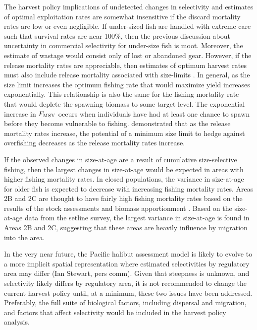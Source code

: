 The harvest policy implications of undetected changes in selectivity and estimates of optimal exploitation rates are somewhat insensitive if the discard mortality rates are low or even negligible.  If under-sized fish are handled with extreme care such that survival rates are near 100\%, then the previous discussion about uncertainty in commercial selectivity for under-size fish is moot.  Moreover, the estimate of wastage would consist only of lost or abandoned gear.  However, if the release mortality rates are appreciable, then estimates of optimum harvest rates must also include release mortality associated with size-limits  \citep{goodyear1993spawning,coggins2007ecm}.  In general,  as the size limit increases the optimum fishing rate that would maximize yield increases exponentially.  This relationship is also the same for the fishing mortality rate that would deplete the spawning biomass to some target level.  The exponential increase in $F_{\rm{MSY}}$ occurs when individuals have had at least one chance to spawn before they become vulnerable to fishing.  \cite{pineiii2008car} demonstrated that as the release mortality rates increase, the potential of a minimum size limit to hedge against overfishing decreases as the release mortality rates increase.

If the observed changes in size-at-age are a result of cumulative size-selective fishing, then the largest changes in size-at-age would be expected in areas with higher fishing mortality rates.  In closed populations, the variance in size-at-age for older fish is expected to decrease with increasing fishing mortality rates.  Areas 2B and 2C are thought to have fairly high fishing mortality rates based on the results of the stock assessments and biomass apportionment \citep{Hare2012Rara}.  Based on the size-at-age data from the setline survey, the largest variance in size-at-age is found in Areas 2B and 2C, suggesting that these areas are heavily influence by migration into the area.


In the very near future, the Pacific halibut assessment model is likely to evolve to a more implicit spatial representation where estimated selectivities by regulatory area may differ (Ian Stewart, pers comm).  Given that steepness is unknown, and selectivity likely differs by regulatory area, it is not recommended to change the current harvest policy until, at a minimum, these two issues have been addressed.  Preferably, the full suite of biological factors, including dispersal and migration, and factors that affect selectivity would be included in the harvest policy analysis.

